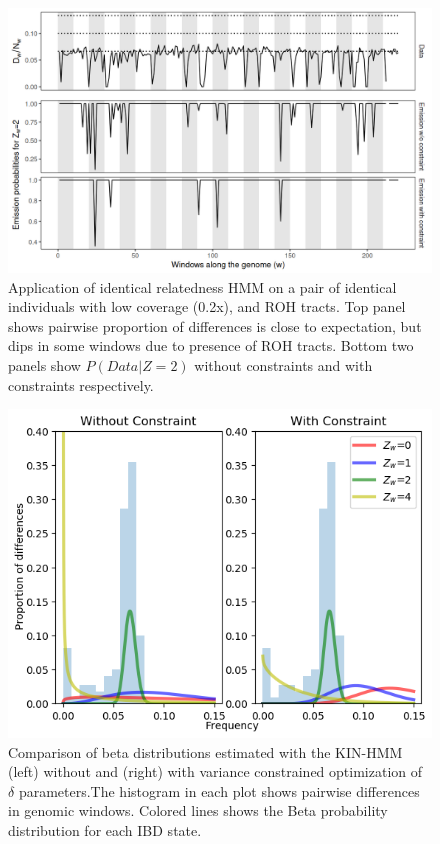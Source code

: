 \documentclass[12pt, letterpaper]{article}
\begin{document}
\begin{figure}[h!]
    \includegraphics[width=18cm]{supplementary_info/plots/contam0_inbred1_run57_coverage0.2_asc0_inputMode_hapProbs_fil0_pair0_15_relid_emissions_bnds.png}
    \centering
    \caption{Application of identical relatedness HMM on a pair of identical individuals with low coverage (0.2x), and ROH tracts. Top panel shows pairwise proportion of differences is close to expectation, but dips in some windows due to presence of ROH tracts. Bottom two panels show $P(Data|Z=2)$ without constraints and with constraints respectively.}
    \label{figS3:bnds}
\end{figure}



\begin{figure}[h!]
    \includegraphics[width=18cm]{supplementary_info/plots/contam0_inbred1_run57_coverage0.2_asc0_inputMode_hapProbs_fil0_pair0_15_relid_betaplot.png}
    \centering
    \caption{Comparison of beta distributions estimated with the KIN-HMM (left) without and (right) with variance constrained optimization of $\delta$ parameters.The histogram in each plot shows pairwise differences in genomic windows. Colored lines shows the Beta probability distribution for each IBD state.}
    \label{figS4:bndsbeta}
\end{figure}
\end{document}

